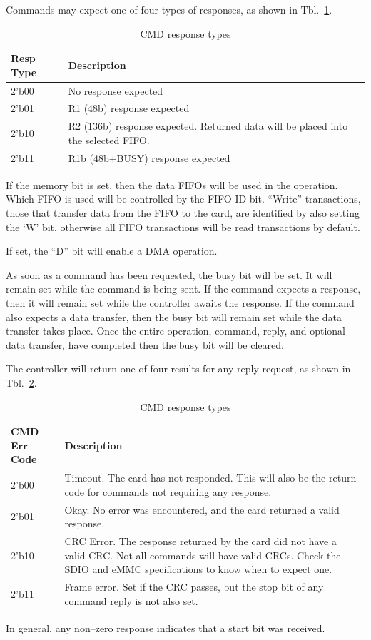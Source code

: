 \documentclass{gqtekspec}
\begin{document}
Commands may expect one of four types of responses, as shown in
Tbl.~\ref{tbl:CMD-TYPE}.
\begin{table}\begin{center}
\begin{tabular}{|p{1.2in}|p{4.0in}|}\hline
	\rowcolor[gray]{0.85} Resp Type & Description\\\hline\hline
2'b00 & No response expected \\
2'b01 & R1 (48b) response expected\\
2'b10 & R2 (136b) response expected.  Returned data will be placed into
	the selected FIFO.\\
2'b11 & R1b (48b+BUSY) response expected
	\\\hline
\end{tabular}
\caption{CMD response types}\label{tbl:CMD-TYPE}
\end{center}\end{table}

If the memory bit is set, then the data FIFOs will be used in the operation.
Which FIFO is used will be controlled by the FIFO ID bit.  ``Write''
transactions, those that transfer data from the FIFO to the card, are
identified by also setting the `W' bit, otherwise all FIFO transactions
will be read transactions by default.

If set, the ``D'' bit will enable a DMA operation.

As soon as a command has been requested, the busy bit will be set.  It will
remain set while the command is being sent.  If the command expects a response,
then it will remain set while the controller awaits the response.  If the
command also expects a data transfer, then the busy bit will remain set while
the data transfer takes place.  Once the entire operation, command, reply,
and optional data transfer, have completed then the busy bit will be cleared.

The controller will return one of four results for any reply request, as
shown in Tbl.~\ref{tbl:CMD-REPLY}.
\begin{table}\begin{center}
\begin{tabular}{|p{1.2in}|p{4.0in}|}\hline
	\rowcolor[gray]{0.85} CMD Err Code & Description\\\hline\hline
2'b00 & Timeout.  The card has not responded.  This will also be the
	return code for commands not requiring any response.\\
2'b01 & Okay.  No error was encountered, and the card returned a valid
	response.\\
2'b10 & CRC Error.  The response returned by the card did not have a valid
	CRC.  Not all commands will have valid CRCs.  Check the SDIO and eMMC
	specifications to know when to expect one.\\
2'b11 & Frame error.  Set if the CRC passes, but the stop bit of any command
	reply is not also set.
	\\\hline
\end{tabular}
\caption{CMD response types}\label{tbl:CMD-REPLY}
\end{center}\end{table}
In general, any non--zero response indicates that a start bit was received.
\end{document}
